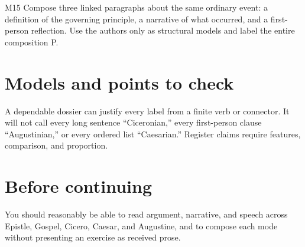 \begin{courseunit}{M15}
Compose three linked paragraphs about the same ordinary event: a definition of
the governing principle, a narrative of what occurred, and a first-person
reflection.  Use the authors only as structural models and label the entire
composition P.

\ifsolutions
\section{Models and points to check}
A dependable dossier can justify every label from a finite verb or connector.
It will not call every long sentence ``Ciceronian,'' every first-person clause
``Augustinian,'' or every ordered list ``Caesarian.''  Register claims require
features, comparison, and proportion.
\else
\section{Before continuing}
You should reasonably be able to read argument, narrative, and speech across
Epistle, Gospel, Cicero, Caesar, and Augustine, and to compose each mode without
presenting an exercise as received prose.
\fi
\end{courseunit}

